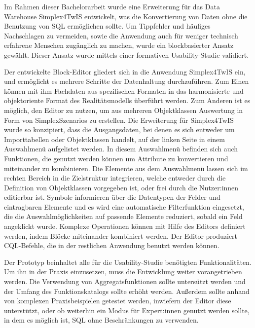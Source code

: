 Im Rahmen dieser Bachelorarbeit wurde eine Erweiterung für das Data Warehouse Simplex4TwIS entwickelt, was die Konvertierung von Daten ohne die Benutzung von \acs{SQL} ermöglichen sollte. Um Tippfehler und häufiges Nachschlagen zu vermeiden, sowie die Anwendung auch für weniger technisch erfahrene Menschen zugänglich zu machen, wurde ein blockbasierter Ansatz gewählt. Dieser Ansatz wurde mittels einer formativen Usability-Studie validiert.

\pskip
Der entwickelte Block-Editor gliedert sich in die Anwendung Simplex4TwIS ein, und ermöglicht es mehrere Schritte der Datenhaltung durchzuführen. Zum Einen können mit ihm Fachdaten aus spezifischen Formaten in das harmonisierte und objektoriente Format des Realitätsmodells überführt werden. Zum Anderen ist es möglich, den Editor zu nutzen, um aus mehreren Objektklassen Auswertung in Form von SimplexSzenarios zu erstellen. Die Erweiterung für Simplex4TwIS wurde so konzipiert, dass die Ausgangsdaten, bei denen es sich entweder um Importtabellen oder Objektklassen handelt, auf der linken Seite in einem Auswahlmenü aufgelistet werden. In diesem Auswahlmenü befinden sich auch Funktionen, die genutzt werden können um Attribute zu konvertieren und miteinander zu kombinieren. Die Elemente aus dem Auswahlmenü lassen sich im rechten Bereich in die Zielstruktur integrieren, welche entweder durch die Definition von Objektklassen vorgegeben ist, oder frei durch die Nutzer:innen editierbar ist. Symbole informieren über die Datentypen der Felder und eintragbaren Elemente und es wird eine automatische Filterfunktion eingesetzt, die die Auswahlmöglichkeiten auf passende Elemente reduziert, sobald ein Feld angeklickt wurde. Komplexe Operationen können mit Hilfe des Editors definiert werden, indem Blöcke miteinander kombiniert werden. Der Editor produziert \acs{CQL}-Befehle, die in der restlichen Anwendung benutzt werden können.

Der Prototyp beinhaltet alle für die Usability-Studie benötigten Funktionalitäten. Um ihn in der Praxis einzusetzen, muss die Entwicklung weiter vorangetrieben werden. Die Verwendung von Aggregatsfunktionen sollte untersützt werden und der Umfang des Funktionskatalogs sollte erhöht werden. Außerdem sollte anhand von komplexen Praxisbeispielen getestet werden, inwiefern der Editor diese unterstützt, oder ob weiterhin ein Modus für Expert:innen genutzt werden sollte, in dem es möglich ist, \ac{SQL} ohne Beschränkungen zu verwenden.

